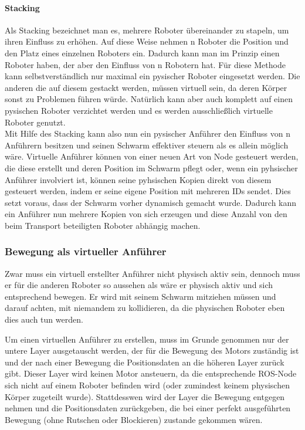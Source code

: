 \paragraph*{Stacking}
Als Stacking bezeichnet man es, mehrere Roboter übereinander zu stapeln, um ihren Einfluss zu erhöhen. Auf diese Weise nehmen n Roboter die Position und den Platz eines einzelnen Roboters ein. Dadurch kann man im Prinzip einen Roboter haben, der aber den Einfluss von n Robotern hat. Für diese Methode kann selbstverständlich nur maximal ein pysischer Roboter eingesetzt werden. Die anderen die auf diesem gestackt werden, müssen virtuell sein, da deren Körper sonst zu Problemen führen würde. Natürlich kann aber auch komplett auf einen pysischen Roboter verzichtet werden und es werden ausschließlich virtuelle Roboter genutzt.\\

Mit Hilfe des Stacking kann also nun ein pysischer Anführer den Einfluss von n Anführern besitzen und seinen Schwarm effektiver steuern als es allein möglich wäre. Virtuelle Anführer können von einer neuen Art von Node gesteuert werden, die diese erstellt und deren Position im Schwarm pflegt oder, wenn ein pyhsischer Anführer involviert ist, können seine pyhsischen Kopien direkt von diesem gesteuert werden, indem er seine eigene Position mit mehreren IDs sendet. Dies setzt voraus, dass der Schwarm vorher dynamisch gemacht wurde. Dadurch kann ein Anführer nun mehrere Kopien von sich erzeugen und diese Anzahl von den beim Transport beteiligten Roboter abhängig machen.

\subsubsection*{Bewegung als virtueller Anführer}

Zwar muss ein virtuell erstellter Anführer nicht physisch aktiv sein, dennoch muss er für die anderen Roboter so aussehen als wäre er physisch aktiv und sich entsprechend bewegen. Er wird mit seinem Schwarm mitziehen müssen und darauf achten, mit niemandem zu kollidieren, da die physischen Roboter eben dies auch tun werden.

Um einen virtuellen Anführer zu erstellen, muss im Grunde genommen nur der untere Layer ausgetauscht werden, der für die Bewegung des Motors zuständig ist und der nach einer Bewegung die Positionsdaten an die höheren Layer zurück gibt.
Dieser Layer wird keinen Motor ansteuern, da die entsprechende \ac{ROS}-Node sich nicht auf einem Roboter befinden wird (oder zumindest keinem physischen Körper zugeteilt wurde). Stattdesswen wird der Layer die Bewegung entgegen nehmen und die Positionsdaten zurückgeben, die bei einer perfekt ausgeführten Bewegung (ohne Rutschen oder Blockieren) zustande gekommen wären.





